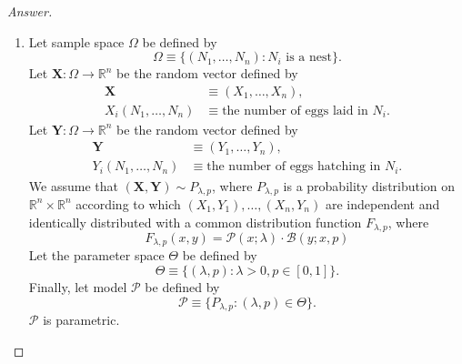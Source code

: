 \documentclass{amsbook}
\theoremstyle{definition}
\theoremstyle{remark}
\numberwithin{section}{chapter}
\numberwithin{equation}{chapter}
\begin{document}
\begin{proof}[Answer]
\begin{enumerate}[label=(\alph*)]
\[X_i\sim\mathcal{N}(\mu+\mu',\sigma_0^2),\quad\forall i=1,\dots,n.
\]That is to say, $\mathbf{X}\sim P_{\mu,\mu'}$, where $P_{\mu,\mu'}$ is a probability distribution on $\mathbb{R}^n$ according to which $X_1,\dots,X_n$ are independent and identically distributed with a common $\mathcal{N}(\mu+\mu',\sigma_0^2)$ distribution. Let the parameter space $\Theta$ be defined by\[
\Theta\equiv\{(\mu,\mu'):\mu\in\mathbb{R},\mu'\in\mathbb{R}\}.
\]Finally, let model $\mathcal{P}$ be defined by\[
\mathcal{P}\equiv\{P_{\mu,\mu'}:(\mu,\mu')\in\Theta\}.
\]$\mathcal{P}$ is parametric.
\item Let sample space $\Omega$ be defined by\[
\Omega\equiv\{(N_1,\dots,N_n):N_i\text{ is a nest}\}.
\]Let $\mathbf{X}:\Omega\to\mathbb{R}^n$ be the random vector defined by\[
\begin{split}
\mathbf{X}&\equiv(X_1,\dots,X_n),\\
X_i(N_1,\dots,N_n)&\equiv\text{the number of eggs laid in }N_i.
\end{split}
\]Let $\mathbf{Y}:\Omega\to\mathbb{R}^n$ be the random vector defined by\[
\begin{split}
\mathbf{Y}&\equiv(Y_1,\dots,Y_n),\\
Y_i(N_1,\dots,N_n)&\equiv\text{the number of eggs hatching in }N_i.
\end{split}
\]We assume that $(\mathbf{X},\mathbf{Y})\sim P_{\lambda,p}$, where $P_{\lambda,p}$ is a probability distribution on $\mathbb{R}^{n}\times\mathbb{R}^{n}$ according to which $(X_1,Y_1),\dots,(X_n,Y_n)$ are independent and identically distributed with a common distribution function $F_{\lambda,p}$, where\[
F_{\lambda,p}(x,y)=\mathcal{P}(x;\lambda)\cdot\mathcal{B}(y;x,p)
\]Let the parameter space $\Theta$ be defined by\[
\Theta\equiv\{(\lambda,p):\lambda>0,p\in[0,1]\}.
\]Finally, let model $\mathcal{P}$ be defined by\[
\mathcal{P}\equiv\{P_{\lambda,p}:(\lambda,p)\in\Theta\}.
\]$\mathcal{P}$ is parametric.
\end{enumerate}
\end{proof}
\end{document}
